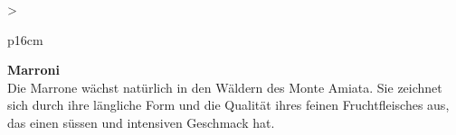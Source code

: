 \documentclass[
  beamerpaper,
  DIV=11,
  numbers=noendperiod,
  aspectratio=54]{scrreprt}
\begin{document}
\begin{table}

\caption{\label{tbl-panel-cast}Castagne}\begin{minipage}[t]{\linewidth}

\tabularnewline

\fontsize{16}{18}\selectfont
\begin{tabular}{>{\raggedright\arraybackslash}p{16cm}}
\toprule
\begingroup\fontsize{18}{20}\selectfont \textbf{Marroni}\endgroup\\
\midrule
Die Marrone wächst natürlich in den Wäldern des Monte Amiata. Sie zeichnet sich durch ihre längliche Form und die Qualität ihres feinen Fruchtfleisches aus, das einen süssen und intensiven Geschmack hat.\\
\bottomrule
\end{tabular}

\end{minipage}%
\newline
\begin{minipage}[t]{\linewidth}


\end{minipage}%

\end{table}
\end{document}
